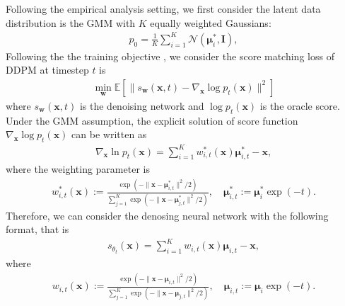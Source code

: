 Following the empirical analysis setting, we first consider the latent data distribution is the GMM with $K$ equally weighted Gaussians:
\begin{align}
\label{eq:gmm}
    p_0 = \frac{1}{K} \sum_{i=1}^{K} \mathcal{N}(\boldsymbol{{\mu}}^*_i, \mathbf{I}),
\end{align}
Following the the training objective \cite{shah2023learning}, we consider  the score matching loss of DDPM at timestep $t$ is
\begin{align}
\label{eq:training}
  \min_{\mathbf w} \mathbb E[\|s_{\mathbf w}(\mathbf x,t)-\nabla_{\mathbf x} \log p_t(\mathbf x)\|^2] 
\end{align}
where $s_{\mathbf w}(\mathbf x,t)$ is the denoising network and $\log p_t(\mathbf x)$ is the oracle score. Under the GMM assumption, the explicit solution of score function $\nabla_{\mathbf x} \log p_t(\mathbf x)$ can be written as
\begin{align}
\label{eq:score}
    \nabla_{\mathbf x} \ln p_t(\mathbf x) = \sum_{i=1}^K w_{i,t}^*(\mathbf x) \boldsymbol{{\mu}}_{i,t}^* - \mathbf x,
\end{align}
where the weighting parameter is 
\begin{align}
    w_{i,t}^*(\mathbf x) := \frac{\exp(-\|\mathbf x - \boldsymbol{{\mu}}_{i,t}^*\|^2 / 2)}{\sum_{j=1}^K \exp(-\|\mathbf x - \boldsymbol{{\mu}}_{j,t}^*\|^2 / 2)}, \quad \boldsymbol{{\mu}}^*_{i,t} := \boldsymbol{{\mu}}^*_i \exp(-t).
\end{align}
Therefore, we can consider the denosing neural network with the following format, that is
\begin{align}
\label{eq:denosing}
    s_{\theta_t}(\mathbf x) = \sum_{i=1}^K w_{i,t}(\mathbf x) \boldsymbol{{\mu}}_{i,t} - \mathbf x,  
\end{align}
where
\begin{align}
    w_{i,t}(\mathbf x) := \frac{\exp(-\|\mathbf x - \boldsymbol{{\mu}}_{i,t}\|^2 / 2)}{\sum_{j=1}^K \exp(-\|\mathbf x - \boldsymbol{{\mu}}_{j,t}\|^2 / 2)}, \quad \boldsymbol{{\mu}}_{i,t} := \boldsymbol{{\mu}}_i \exp(-t).
\end{align}

